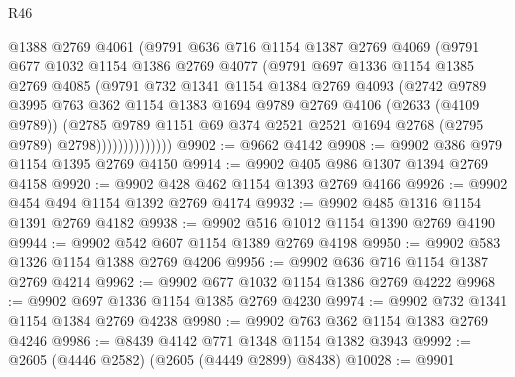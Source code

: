 \begin{lexlean}{R46}
\begin{coremodule}
                    @1388
                    @2769
                    @4061
                    (@9791
                      @636
                      @716
                      @1154
                      @1387
                      @2769
                      @4069
                      (@9791
                        @677
                        @1032
                        @1154
                        @1386
                        @2769
                        @4077
                        (@9791
                          @697
                          @1336
                          @1154
                          @1385
                          @2769
                          @4085
                          (@9791
                            @732
                            @1341
                            @1154
                            @1384
                            @2769
                            @4093
                            (@2742
                              @9789
                              @3995
                              @763
                              @362
                              @1154
                              @1383
                              @1694
                              @9789
                              @2769
                              @4106
                              (@2633 (@4109 @9789))
                              (@2785
                                @9789
                                @1151
                                @69
                                @374
                                @2521
                                @2521
                                @1694
                                @2768
                                (@2795 @9789)
                                @2798))))))))))))))
@9902 := @9662 @4142
@9908 := @9902 @386 @979 @1154 @1395 @2769 @4150
@9914 := @9902 @405 @986 @1307 @1394 @2769 @4158
@9920 := @9902 @428 @462 @1154 @1393 @2769 @4166
@9926 := @9902 @454 @494 @1154 @1392 @2769 @4174
@9932 := @9902 @485 @1316 @1154 @1391 @2769 @4182
@9938 := @9902 @516 @1012 @1154 @1390 @2769 @4190
@9944 := @9902 @542 @607 @1154 @1389 @2769 @4198
@9950 := @9902 @583 @1326 @1154 @1388 @2769 @4206
@9956 := @9902 @636 @716 @1154 @1387 @2769 @4214
@9962 := @9902 @677 @1032 @1154 @1386 @2769 @4222
@9968 := @9902 @697 @1336 @1154 @1385 @2769 @4230
@9974 := @9902 @732 @1341 @1154 @1384 @2769 @4238
@9980 := @9902 @763 @362 @1154 @1383 @2769 @4246
@9986 := @8439 @4142 @771 @1348 @1154 @1382 @3943
@9992 := @2605 (@4446 @2582) (@2605 (@4449 @2899) @8438)
@10028 := @9901

\end{coremodule}
\end{lexlean}
